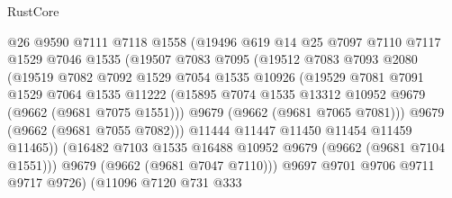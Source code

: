 \begin{lexlean}{RustCore}
\begin{coremodule}
                          @26
                          @9590
                          @7111
                          @7118
                          @1558
                          (@19496
                            @619
                            @14
                            @25
                            @7097
                            @7110
                            @7117
                            @1529
                            @7046
                            @1535
                            (@19507
                              @7083
                              @7095
                              (@19512
                                @7083
                                @7093
                                @2080
                                (@19519
                                  @7082
                                  @7092
                                  @1529
                                  @7054
                                  @1535
                                  @10926
                                  (@19529
                                    @7081
                                    @7091
                                    @1529
                                    @7064
                                    @1535
                                    @11222
                                    (@15895
                                      @7074
                                      @1535
                                      @13312
                                      @10952
                                      @9679
                                      (@9662 (@9681 @7075 @1551)))
                                    @9679
                                    (@9662 (@9681 @7065 @7081)))
                                  @9679
                                  (@9662 (@9681 @7055 @7082)))
                                @11444
                                @11447
                                @11450
                                @11454
                                @11459
                                @11465))
                            (@16482 @7103 @1535 @16488 @10952 @9679 (@9662 (@9681 @7104 @1551)))
                            @9679
                            (@9662 (@9681 @7047 @7110)))
                          @9697
                          @9701
                          @9706
                          @9711
                          @9717
                          @9726)
                        (@11096
                          @7120
                          @731
                          @333

\end{coremodule}
\end{lexlean}
